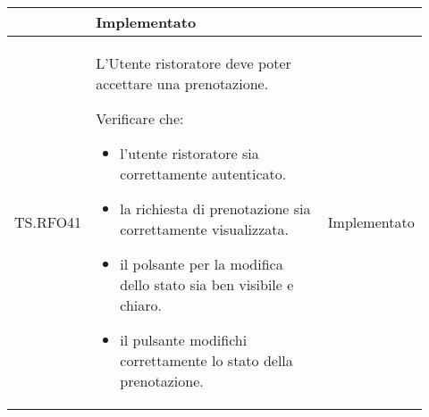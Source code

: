 \begin{longtable}{|p{0.10\linewidth}|p{0.70\linewidth}|p{0.12\linewidth}|}
\begin{itemize}
	\end{itemize}                                           &
	Implementato                                                                                                                                                            \\
	\hline
	TS.RFO41                                                                                                                        &
	L'Utente ristoratore deve poter accettare una prenotazione. \par
	Verificare che:
	\begin{itemize}
		\item l'utente ristoratore sia correttamente autenticato.
		\item la richiesta di prenotazione sia correttamente visualizzata.
		\item il polsante per la modifica dello stato sia ben visibile e chiaro.
		\item il pulsante modifichi correttamente lo stato della prenotazione.
	\end{itemize}                                                        &
	Implementato                                                                                                                                                            \\
	\hline


\end{longtable}
